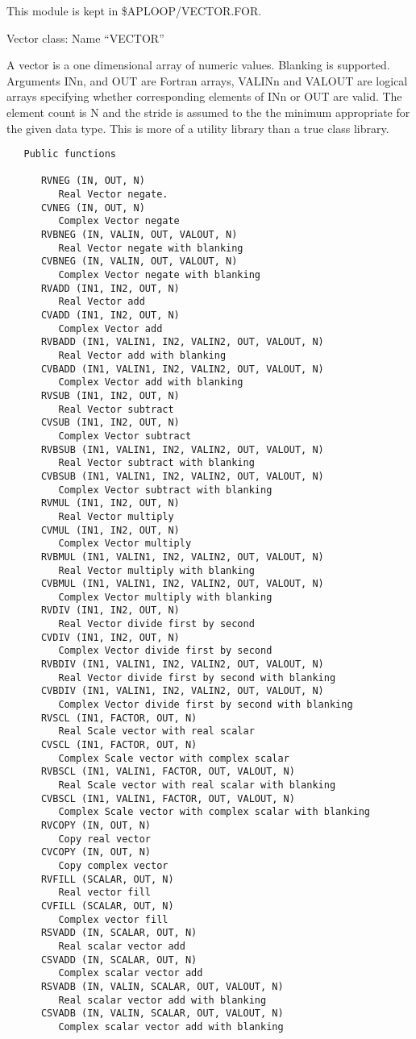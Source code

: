    This module is kept in \$APLOOP/VECTOR.FOR.

   Vector class: Name ``VECTOR''

   A vector is a one dimensional array of numeric values.  Blanking is
supported.  Arguments INn, and OUT are Fortran arrays, VALINn and VALOUT
are logical arrays specifying whether corresponding elements of INn or
OUT are valid.  The element count is N and the stride is assumed to
the the minimum appropriate for the given data type.  This is more of
a utility library than a true class library.
{\small\begin{verbatim}
   Public functions

      RVNEG (IN, OUT, N)
         Real Vector negate.
      CVNEG (IN, OUT, N)
         Complex Vector negate
      RVBNEG (IN, VALIN, OUT, VALOUT, N)
         Real Vector negate with blanking
      CVBNEG (IN, VALIN, OUT, VALOUT, N)
         Complex Vector negate with blanking
      RVADD (IN1, IN2, OUT, N)
         Real Vector add
      CVADD (IN1, IN2, OUT, N)
         Complex Vector add
      RVBADD (IN1, VALIN1, IN2, VALIN2, OUT, VALOUT, N)
         Real Vector add with blanking
      CVBADD (IN1, VALIN1, IN2, VALIN2, OUT, VALOUT, N)
         Complex Vector add with blanking
      RVSUB (IN1, IN2, OUT, N)
         Real Vector subtract
      CVSUB (IN1, IN2, OUT, N)
         Complex Vector subtract
      RVBSUB (IN1, VALIN1, IN2, VALIN2, OUT, VALOUT, N)
         Real Vector subtract with blanking
      CVBSUB (IN1, VALIN1, IN2, VALIN2, OUT, VALOUT, N)
         Complex Vector subtract with blanking
      RVMUL (IN1, IN2, OUT, N)
         Real Vector multiply
      CVMUL (IN1, IN2, OUT, N)
         Complex Vector multiply
      RVBMUL (IN1, VALIN1, IN2, VALIN2, OUT, VALOUT, N)
         Real Vector multiply with blanking
      CVBMUL (IN1, VALIN1, IN2, VALIN2, OUT, VALOUT, N)
         Complex Vector multiply with blanking
      RVDIV (IN1, IN2, OUT, N)
         Real Vector divide first by second
      CVDIV (IN1, IN2, OUT, N)
         Complex Vector divide first by second
      RVBDIV (IN1, VALIN1, IN2, VALIN2, OUT, VALOUT, N)
         Real Vector divide first by second with blanking
      CVBDIV (IN1, VALIN1, IN2, VALIN2, OUT, VALOUT, N)
         Complex Vector divide first by second with blanking
      RVSCL (IN1, FACTOR, OUT, N)
         Real Scale vector with real scalar
      CVSCL (IN1, FACTOR, OUT, N)
         Complex Scale vector with complex scalar
      RVBSCL (IN1, VALIN1, FACTOR, OUT, VALOUT, N)
         Real Scale vector with real scalar with blanking
      CVBSCL (IN1, VALIN1, FACTOR, OUT, VALOUT, N)
         Complex Scale vector with complex scalar with blanking
      RVCOPY (IN, OUT, N)
         Copy real vector
      CVCOPY (IN, OUT, N)
         Copy complex vector
      RVFILL (SCALAR, OUT, N)
         Real vector fill
      CVFILL (SCALAR, OUT, N)
         Complex vector fill
      RSVADD (IN, SCALAR, OUT, N)
         Real scalar vector add
      CSVADD (IN, SCALAR, OUT, N)
         Complex scalar vector add
      RSVADB (IN, VALIN, SCALAR, OUT, VALOUT, N)
         Real scalar vector add with blanking
      CSVADB (IN, VALIN, SCALAR, OUT, VALOUT, N)
         Complex scalar vector add with blanking
\end{verbatim}}

